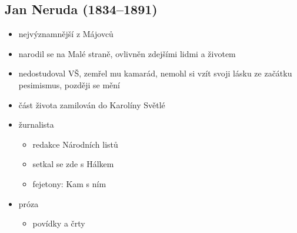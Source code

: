 \subsection{Jan Neruda (1834--1891)}
\begin{itemize}
\item nejvýznamnější z Májovců
\item narodil se na Malé straně, ovlivněn zdejšími lidmi a životem
\item nedostudoval VŠ, zemřel mu kamarád, nemohl si vzít svoji lásku \ra ze začátku pesimismus, později se mění
\item část života zamilován do Karolíny Světlé
\item žurnalista
	\begin{itemize}
	\item redakce Národních listů
	\item setkal se zde s Hálkem
	\item fejetony: Kam s ním
	\end{itemize}
\item próza
	\begin{itemize}
	\item povídky a črty
	\end{itemize}


\end{itemize}
